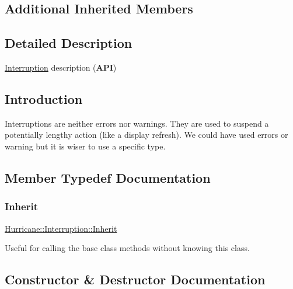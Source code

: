 \subsection*{Additional Inherited Members}


\subsection{Detailed Description}
\hyperlink{classHurricane_1_1Interruption}{Interruption} description ({\bfseries A\+PI}) 

\hypertarget{classHurricane_1_1Interruption_secInterruptionIntro}{}\subsection{Introduction}\label{classHurricane_1_1Interruption_secInterruptionIntro}
Interruptions are neither errors nor warnings. They are used to suspend a potentially lengthy action (like a display refresh). We could have used errors or warning but it is wiser to use a specific type. 

\subsection{Member Typedef Documentation}
\mbox{\label{classHurricane_1_1Interruption_a47ecad9b4b2bd34a21de4a0d6fdf1f5d}} 
\subsubsection{\texorpdfstring{Inherit}{Inherit}}
{\footnotesize\ttfamily \hyperlink{classHurricane_1_1Interruption_a47ecad9b4b2bd34a21de4a0d6fdf1f5d}{Hurricane\+::\+Interruption\+::\+Inherit}}

Useful for calling the base class methods without knowing this class. 

\subsection{Constructor \& Destructor Documentation}
\mbox{\label{classHurricane_1_1Interruption_ae6375068418b2898b95c3cb7974e051c}} 
